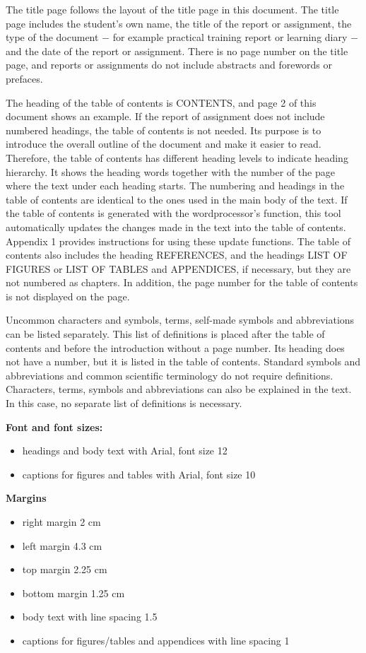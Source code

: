 \documentclass{article}
\begin{document}
The title page follows the layout of the title page in this document. The title page includes the student’s own name, the title of the report or assignment, the type of the document − for example practical training report or learning diary − and the date of the report or assignment. There is no page number on the title page, and reports or assignments 
do not include abstracts and forewords or prefaces. 

The heading of the table of contents is CONTENTS, and page 2 of this document shows an example. If the report of assignment does not include numbered headings, the table of contents is not needed. Its purpose is to introduce the overall outline of the document and make it easier to read. Therefore, the table of contents has different heading levels to indicate heading hierarchy. It shows the heading words together with the number of the page where the text under each heading starts. The numbering and headings in the table of contents are identical to the ones used in the main body of the text. If the table of contents is generated with the wordprocessor’s function, this tool automatically updates the changes made in the text into the table of contents. Appendix 1 provides instructions for using these update functions. The table of contents also includes the heading REFERENCES, and the headings LIST OF FIGURES or LIST OF TABLES and APPENDICES, if necessary, but they are not numbered as chapters. In addition, the page number for the table of contents is not displayed on the page.

Uncommon characters and symbols, terms, self-made symbols and abbreviations can be listed separately. This list of definitions is placed after the table of contents and before the introduction without a page number. Its heading does not have a number, but it is listed in the table of contents. Standard symbols and abbreviations and common scientific terminology do not require definitions. Characters, terms, symbols and abbreviations can also be explained in the text. In this case, no separate list of definitions is necessary.


\textbf{Font and font sizes:}

\begin{itemize}
	\item{headings and body text with Arial, font size 12}
	\item{captions for figures and tables with Arial, font size 10}
\end{itemize}

\textbf{Margins}

\begin{itemize}
	\item{right margin 2 cm}
	\item{left margin 4.3 cm}
	\item{top margin 2.25 cm}
	\item{bottom margin 1.25 cm}
	\item{body text with line spacing 1.5}
	\item{captions for figures/tables and appendices with line spacing 1}
\end{itemize}
\end{document}
